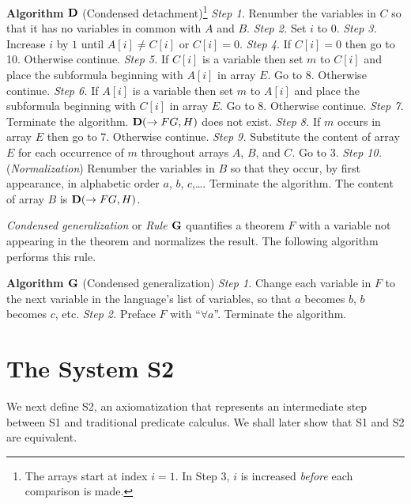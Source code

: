 \documentclass[leqno]{article}
\begin{document}
{\bf Algorithm ${\bf D}$} (Condensed detachment)\footnote{The arrays
start at index $i=1$.  In Step 3, $i$ is increased {\em before}
each comparison is made.} \hspace{.5em}
  {\em Step 1.} Renumber the variables in $C$ so that it has no variables
      in common with $A$ and $B$.
  {\em Step 2.} Set $i$ to $0$.
  {\em Step 3.} Increase $i$ by $1$ until $A[i]\neq C[i]$ or $C[i]=0$.
  {\em Step 4.} If $C[i]=0$ then go to 10.  Otherwise continue.
  {\em Step 5.} If $C[i]$ is a variable then set $m$ to $C[i]$ and place the
      subformula beginning with $A[i]$ in array $E$.  Go to 8.
      Otherwise continue.
  {\em Step 6.} If $A[i]$ is a variable then set $m$ to $A[i]$ and place the
      subformula beginning with $C[i]$ in array $E$.  Go to 8.
      Otherwise continue.
  {\em Step 7.} Terminate the algorithm.  ${\bf D}(\rightarrow FG,H)$ does
      not exist.
  {\em Step 8.} If $m$ occurs in array $E$ then go to 7.  Otherwise
      continue.
  {\em Step 9.} Substitute the content of array $E$ for each occurrence
      of $m$ throughout arrays $A$, $B$, and $C$.  Go to 3.
  {\em Step 10.} ({\em Normalization}) Renumber the variables in $B$ so that
      they occur, by first appearance, in alphabetic order
      $a$, $b$, $c$,\ldots .  Terminate the
      algorithm.  The content of array $B$ is ${\bf D}(\rightarrow FG,H)$.


     {\em Condensed generalization} or {\em Rule ${\bf G}$} quantifies a
theorem $F$ with a variable not appearing in the theorem and normalizes the
result.  The following algorithm performs this rule.

  {\bf Algorithm ${\bf G}$} (Condensed generalization) \hspace{.5em}
  {\em Step 1.} Change each variable in $F$ to the next variable in the
      language's list of variables, so that $a$ becomes $b$, $b$
      becomes $c$, etc.
  {\em Step 2.} Preface $F$ with ``$\forall a$''.  Terminate the algorithm.

\section{The System S2}

     We next define S2, an axiomatization that represents an intermediate
step between S1 and traditional predicate calculus.  We shall later show that
S1 and S2 are equivalent.
\end{document}
